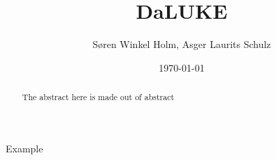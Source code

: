 \documentclass[12pt, fleqn]{article}
\title{DaLUKE}
\author{Søren Winkel Holm, Asger Laurits Schulz}
\date{\today}
\begin{document}
\setlength{\headheight}{15pt}
\addtolength{\topmargin}{-2.5pt}
\maketitle

\begin{abstract}
    The abstract here is made out of abstract
\end{abstract}


\noindent Example \cite{yamada2020luke}

\renewcommand*{\bibfont}{\normalfont\footnotesize}
\printbibliography[heading=bibintoc]

\appendix
\end{document}
